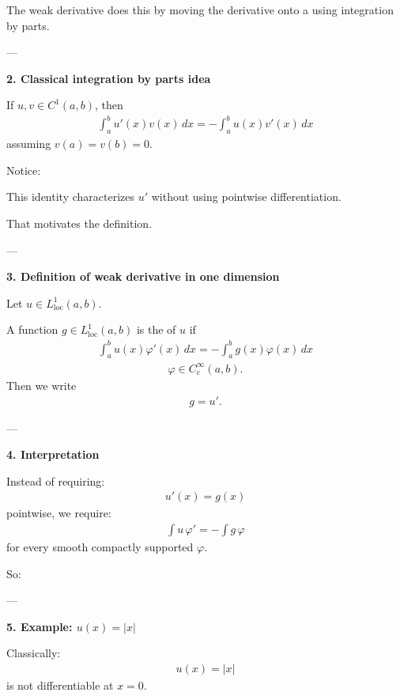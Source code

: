 \documentclass[12pt,a4paper]{report}
\begin{document}
\begin{description}
\begin{description}
The weak derivative does this by moving the derivative onto a  using integration by parts.

---

\item \textbf{2. Classical integration by parts idea}

If $u,v\in C^1(a,b)$, then
\begin{align*}
\int_a^b u'(x)v(x)\,dx = -\int_a^b u(x)v'(x)\,dx
\end{align*}
assuming $v(a)=v(b)=0$.

Notice:

\> This identity characterizes $u'$ without using pointwise differentiation.

That motivates the definition.

---

\item \textbf{3. Definition of weak derivative in one dimension}

Let $u\in L^1_{\mathrm{loc}}(a,b)$.

A function $g\in L^1_{\mathrm{loc}}(a,b)$ is the  of $u$ if
\begin{align*}
\int_a^b u(x)\varphi'(x)\,dx = -\int_a^b g(x)\varphi(x)\,dx 
\end{align*}
\begin{align*}
\varphi\in C_c^\infty(a,b).
\end{align*}
Then we write
\begin{align*}
g=u'.
\end{align*}

---

\item \textbf{4. Interpretation}

Instead of requiring:
\begin{align*}
u'(x)=g(x)
\end{align*}
pointwise, we require:
\begin{align*}
\int u\,\varphi'=-\int g\,\varphi
\end{align*}
for every smooth compactly supported $\varphi$.

So:

\> 

---

\item \textbf{5. Example: $u(x)=|x|$}

Classically:
\begin{align*}
u(x)=|x|
\end{align*}
is not differentiable at $x=0$.


\end{description}
\end{description}
\end{document}
